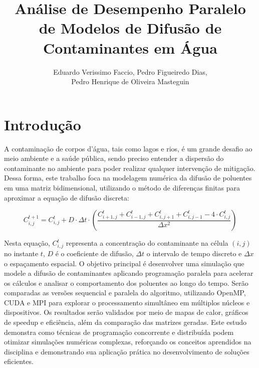 \documentclass[12pt]{article}
\title{Análise de Desempenho Paralelo de Modelos de Difusão de Contaminantes em
  Água}
\author{Eduardo Verissimo Faccio, Pedro Figueiredo Dias, \\
  Pedro Henrique de Oliveira Masteguin}
\begin{document}
\maketitle


\section{Introdução}

A contaminação de corpos d'água, tais como lagos e rios, é um grande desafio ao
meio ambiente e a saúde pública, sendo preciso entender a dispersão do
contaminante no ambiente para poder realizar qualquer intervenção de mitigação.
Dessa forma, este trabalho foca na modelagem numérica da difusão de poluentes
em uma matriz bidimensional, utilizando o método de diferenças finitas para
aproximar a equação de difusão discreta:

\begin{equation}
  C_{i,j}^{t+1} = C_{i,j}^t + D \cdot \Delta t \cdot \left( \frac{C_{i+1,j}^t +
    C_{i-1,j}^t + C_{i,j+1}^t + C_{i,j-1}^t - 4 \cdot C_{i,j}^t}{\Delta x^2}
  \right)
  \label{eq:Difusao}
\end{equation}

Nesta equação, $C_{i,j}^t$ representa a concentração do contaminante na célula
$(i,j)$ no instante $t$, $D$ é o coeficiente de difusão, $\Delta t$ o intervalo
de tempo discreto e $\Delta x$ o espaçamento espacial. O objetivo principal é
desenvolver uma simulação que modele a difusão de contaminantes aplicando
programação paralela para acelerar os cálculos e analisar o comportamento dos
poluentes ao longo do tempo. Serão comparadas as versões sequencial e paralela
do algoritmo, utilizando OpenMP, CUDA e MPI para explorar o processamento
simultâneo em múltiplos núcleos e dispositivos. Os resultados serão validados
por meio de mapas de calor, gráficos de speedup e eficiência, além da
comparação das matrizes geradas. Este estudo demonstra como técnicas de
programação concorrente e distribuída podem otimizar simulações numéricas
complexas, reforçando os conceitos aprendidos na disciplina e demonstrando sua
aplicação prática no desenvolvimento de soluções eficientes.
\end{document}
